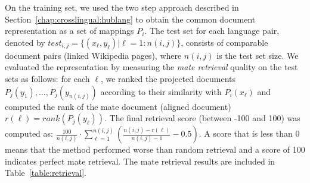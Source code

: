 On the training set, we used the two step approach described in Section~\ref{chap:crosslingual:hublang}
to obtain the common document representation as a set of mappings $P_i$.
The test set for each language pair, denoted by $test_{i,j} = \{(x_\ell,y_\ell) | \ell = 1:n(i,j)\} $,
consists of comparable document pairs (linked Wikipedia pages), where $n(i,j)$ is the test set size.
We evaluated the representation by measuring the \emph{mate retrieval} quality on the test sets as follows:
for each $\ell$, we ranked the projected documents $P_j(y_1),\ldots, P_j(y_{n(i,j)})$ according to
their similarity with $P_i(x_\ell)$ and computed the rank of the mate document (aligned document)
$r(\ell) = rank(P_j(y_\ell))$.
The final retrieval score (between -100 and 100) was computed as:
$\frac{100}{n(i,j)} \cdot \sum_{\ell = 1}^{n(i,j)} \left( \frac{n(i,j) - r(\ell)}{n(i,j) -1} -0.5\right)$.
A score that is less than 0 means that the method performed worse than random retrieval and a score of 100
indicates perfect mate retrieval. The mate retrieval results are included in Table~\ref{table:retrieval}.

